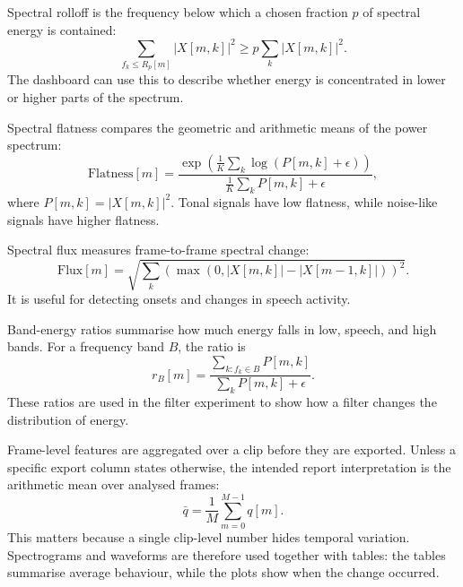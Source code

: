 ﻿\documentclass[11pt,a4paper]{article}
\begin{document}
Spectral rolloff is the frequency below which a chosen fraction $p$ of spectral energy is contained:
\begin{equation}
    \sum_{f_k \leq R_p[m]} |X[m,k]|^2 \geq p \sum_k |X[m,k]|^2.
\end{equation}
The dashboard can use this to describe whether energy is concentrated in lower or higher parts of the spectrum.

Spectral flatness compares the geometric and arithmetic means of the power spectrum:
\begin{equation}
    \mathrm{Flatness}[m] = \frac{\exp\left(\frac{1}{K}\sum_k \log(P[m,k]+\epsilon)\right)}{\frac{1}{K}\sum_k P[m,k]+\epsilon},
\end{equation}
where $P[m,k]=|X[m,k]|^2$. Tonal signals have low flatness, while noise-like signals have higher flatness.

Spectral flux measures frame-to-frame spectral change:
\begin{equation}
    \mathrm{Flux}[m] = \sqrt{\sum_k \left(\max(0, |X[m,k]|-|X[m-1,k]|)\right)^2}.
\end{equation}
It is useful for detecting onsets and changes in speech activity.

Band-energy ratios summarise how much energy falls in low, speech, and high bands. For a frequency band $B$, the ratio is
\begin{equation}
    r_B[m] = \frac{\sum_{k: f_k \in B} P[m,k]}{\sum_k P[m,k]+\epsilon}.
\end{equation}
These ratios are used in the filter experiment to show how a filter changes the distribution of energy.

Frame-level features are aggregated over a clip before they are exported. Unless a specific export column states otherwise, the intended report interpretation is the arithmetic mean over analysed frames:
\begin{equation}
    \bar{q} = \frac{1}{M}\sum_{m=0}^{M-1} q[m].
\end{equation}
This matters because a single clip-level number hides temporal variation. Spectrograms and waveforms are therefore used together with tables: the tables summarise average behaviour, while the plots show when the change occurred.
\end{document}
